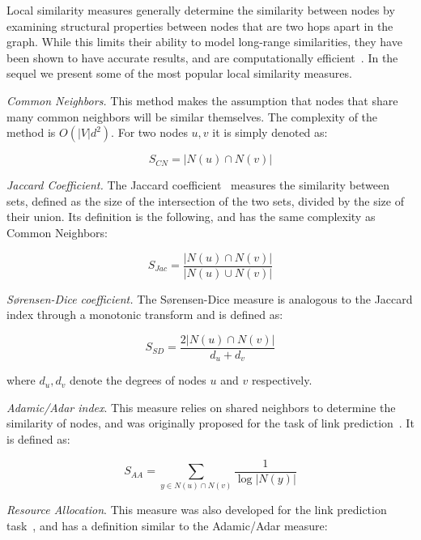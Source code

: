 Local similarity measures generally determine the similarity between
nodes by examining structural properties between nodes that
are two hops apart in the graph. While this limits their ability to model long-range
similarities, they have been shown to have accurate results, and are computationally
efficient~\cite{link-prediction-survey}. In the sequel we present some of the most popular local similarity measures.


\emph{Common Neighbors.} This method makes the assumption that nodes that
share many common neighbors will be similar themselves. The complexity of
the method is $O(|V|d^2)$. For two nodes $u, v$
it is simply denoted as:

\begin{equation}
	S_{CN} = |N(u) \cap N(v)|
\end{equation}


\emph{Jaccard Coefficient.} The Jaccard coefficient~\cite{Jaccard1912} measures the similarity between
sets, defined as the size of the intersection of the two sets, divided by the size of their
union. Its definition is the following, and has the same complexity as Common Neighbors:

\begin{equation}
	S_{Jac} = \frac{|N(u) \cap N(v)|}{|N(u) \cup N(v)|}
\end{equation}

\emph{S{\o}rensen-Dice coefficient.} The S{\o}rensen-Dice measure \cite{Dice45,Sorensen48} is
analogous to the Jaccard index through a monotonic transform and is defined as:

\begin{equation}
	S_{SD} = \frac{2|N(u) \cap N(v)|}{d_u + d_v}
\end{equation}

\noindent
where $d_u, d_v$ denote the degrees of nodes $u$ and $v$ respectively.

\emph{Adamic/Adar index}. This measure relies on shared neighbors to determine
the similarity of nodes, and was originally proposed for the task of link
prediction~\cite{adamic-adar}. It is defined as:

\begin{equation}
	S_{AA} = \sum_{y \in N(u) \cap N(v)}{\frac{1}{\log{|N(y)|}}}
\end{equation}

\emph{Resource Allocation}. This measure was also developed for the
link prediction task~\cite{resource-allocation-sim}, and has a definition
similar to the Adamic/Adar measure:

